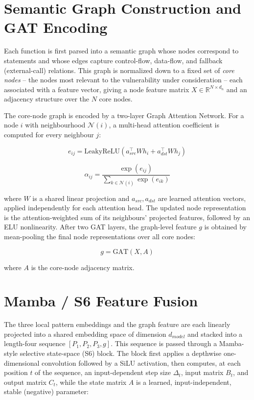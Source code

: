 \documentclass[12pt, a4paper, openright, twoside]{report}
\begin{document}
\section{Semantic Graph Construction and GAT Encoding}

Each function is first parsed into a semantic graph whose nodes correspond to statements and whose edges capture control-flow, data-flow, and fallback (external-call) relations. This graph is normalized down to a fixed set of \textit{core nodes} -- the nodes most relevant to the vulnerability under consideration -- each associated with a feature vector, giving a node feature matrix $X \in \mathbb{R}^{N \times d_n}$ and an adjacency structure over the $N$ core nodes.

The core-node graph is encoded by a two-layer Graph Attention Network. For a node $i$ with neighbourhood $\mathcal{N}(i)$, a multi-head attention coefficient is computed for every neighbour $j$:

\begin{equation}
e_{ij} = \mathrm{LeakyReLU}\left(a_{src}^{\top} W h_i + a_{dst}^{\top} W h_j\right)
\label{eq:gat_score}
\end{equation}

\begin{equation}
\alpha_{ij} = \frac{\exp(e_{ij})}{\sum_{k \in \mathcal{N}(i)} \exp(e_{ik})}
\label{eq:gat_softmax}
\end{equation}

where $W$ is a shared linear projection and $a_{src}, a_{dst}$ are learned attention vectors, applied independently for each attention head. The updated node representation is the attention-weighted sum of its neighbours' projected features, followed by an ELU nonlinearity. After two GAT layers, the graph-level feature $g$ is obtained by mean-pooling the final node representations over all core nodes:

\begin{equation}
g = \mathrm{GAT}(X, A)
\label{eq:graph_feature}
\end{equation}

where $A$ is the core-node adjacency matrix.

\section{Mamba / S6 Feature Fusion}

The three local pattern embeddings and the graph feature are each linearly projected into a shared embedding space of dimension $d_{model}$ and stacked into a length-four sequence $[P_1, P_2, P_3, g]$. This sequence is passed through a Mamba-style selective state-space (S6) block. The block first applies a depthwise one-dimensional convolution followed by a SiLU activation, then computes, at each position $t$ of the sequence, an input-dependent step size $\Delta_t$, input matrix $B_t$, and output matrix $C_t$, while the state matrix $A$ is a learned, input-independent, stable (negative) parameter:
\end{document}

